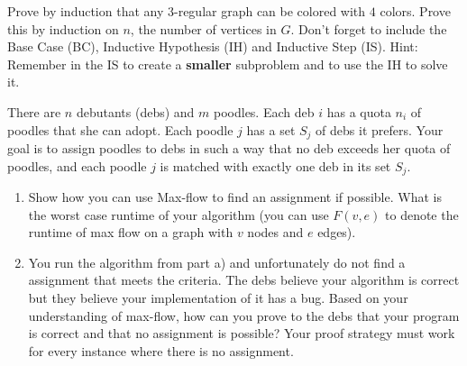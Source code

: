 \documentclass[11pt]{article}
\newcommand{\ans}[1]{}
\begin{document}
\begin{enumerate}
Prove by induction that any $3$-regular graph can be colored with $4$ colors.  Prove this by induction on $n$, the number of vertices in $G$. Don't forget to include the Base Case (BC), Inductive Hypothesis (IH) and Inductive Step (IS).  Hint: Remember in the IS to create a {\bf smaller} subproblem and to use the IH to solve it.  

\ans{We show something a bit stronger: For any graph $G$ where each node has degree at most $3$, $G$ is 4-colorable.  BC: If $n$ = 1 then clearly the graph can be colored with $4$ colors.  IH: For any $j<n$, a $3$ regular graph with $j$ nodes can be colored with $3$ colors.  IS: Let $v$ be some vertex in $G$.  Let $G'$ be the graph you get by removing $v$ and all its edges from $G$.  Note that $G'$ is 3-regular and has $n-1$ vertices.  Thus, by the IH, $G'$ can be colored with at most $4$ colors.  Now if we add $v$ back in, we see that it has exactly $3$ neighbors, which can be colored with at most $3$ different colors.  Hence, there is an extra color available that we can color $v$ with in order to get a $4$ coloring of $G$.}



There are $n$ debutants (debs) and $m$ poodles.  Each deb $i$ has a quota $n_{i}$ of poodles that she can adopt.  Each poodle $j$ has a set $S_{j}$ of debs it prefers.  Your goal is to assign poodles to debs in such a way that no deb exceeds her quota of poodles, and each poodle $j$ is matched with exactly one deb in its set $S_{j}$.

\begin{enumerate}

\item Show how you can use Max-flow to find an assignment if possible.  What is the worst case runtime of your algorithm (you can use $F(v,e)$ to denote the runtime of max flow on a graph with $v$ nodes and $e$ edges).
\ans{Create a graph $G$ containing a vertex for each deb, a vertex for each poodle and a source vertex $s$ and sink vertex $t$.  Add edge from $s$ to each deb vertex $i$ with capacity $n_{i}$.  Add edge from each deb $i$ to poodle $j$ with capacity $1$ if $i \in S_{j}$.  Finally add edge from each poodle $j$ to $t$ with capacity $1$.  Now find the max-flow in this graph.  This takes time $F(n+m,nm)$}

\pagebreak


\item You run the algorithm from part a) and unfortunately do not find a assignment that meets the criteria.  The debs believe your algorithm is correct but they believe your implementation of it has a bug.  Based on your understanding of max-flow, how can you prove to the debs that your program is correct and that no assignment is possible?  Your proof strategy must work for every instance where there is no assignment.


\end{enumerate}
\end{enumerate}
\end{document}
